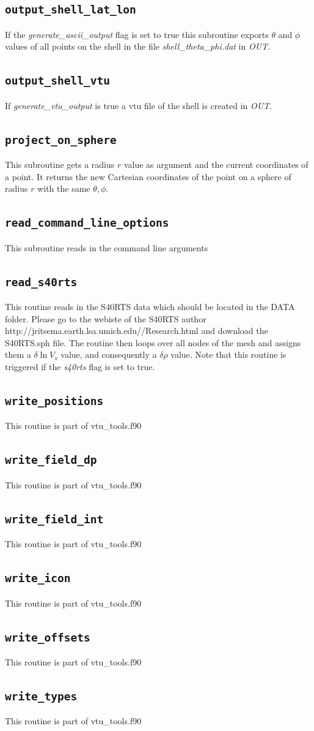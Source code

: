  \subsection{\tt output\_shell\_lat\_lon}
 If the {\sl generate\_ascii\_output} flag is set to true
 this subroutine exports $\theta$ and $\phi$ values of all points on the 
 shell in the file {\sl shell\_theta\_phi.dat} in {\sl OUT}.
 \subsection{\tt output\_shell\_vtu}
 If {\sl generate\_vtu\_output} is true 
 a vtu file of the shell is created in {\sl OUT}.
 \subsection{\tt project\_on\_sphere}
 This subroutine gets a radius $r$ value as argument and the current coordinates
 of a point. It returns the new Cartesian coordinates of the point on a sphere 
 of radius $r$ with the same $\theta,\phi$.
 \subsection{\tt read\_command\_line\_options}
 This subroutine reads in the command line arguments
 \subsection{\tt read\_s40rts}
 This routine reads in the S40RTS data which should be located in the DATA folder. 
 Please go to the webiste of the S40RTS author http://jritsema.earth.lsa.umich.edu//Research.html
 and download the S40RTS.sph file.
 The routine then loops over all nodes of the mesh and assigns them a $\delta \ln V_s$ value, 
 and consequently a $\delta \rho$ value.
 Note that this routine is triggered if the {\sl s40rts} flag is set to true.
 \subsection{\tt write\_positions}
 This routine is part of vtu\_tools.f90
 \subsection{\tt write\_field\_dp}
 This routine is part of vtu\_tools.f90
 \subsection{\tt write\_field\_int}
 This routine is part of vtu\_tools.f90
 \subsection{\tt write\_icon}
 This routine is part of vtu\_tools.f90
 \subsection{\tt write\_offsets}
 This routine is part of vtu\_tools.f90
 \subsection{\tt write\_types}
 This routine is part of vtu\_tools.f90
